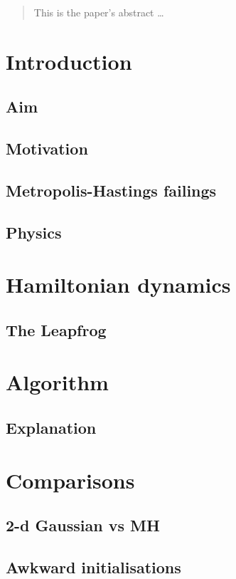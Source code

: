 \documentclass[12pt]{article}
\begin{document}
\maketitle

\begin{abstract}
This is the paper's abstract \ldots
\end{abstract}

\section{Introduction}
\subsection{Aim}
\subsection{Motivation}
\subsection{Metropolis-Hastings failings}
\subsection{Physics}

\section{Hamiltonian dynamics}
\subsection{The Leapfrog}
\section{Algorithm}
\subsection{Explanation}

\section{Comparisons}
\subsection{2-d Gaussian vs MH}
\subsection{Awkward initialisations}
\end{document}
